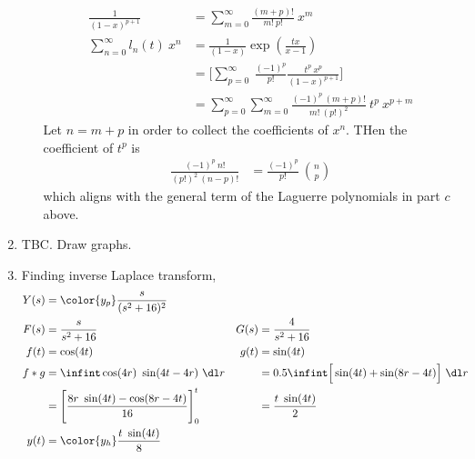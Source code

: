 \begin{enumerate}
\begin{enumerate}
\begin{align}
                        \frac{1}{(1 - x)^{p+1}}           & = \sum_{m=0}^{\infty}
                        \frac{(m+p)!}{m!\ p!}\ x^m                                \\
                        \sum_{n = 0}^{\infty} l_n(t)\ x^n & = \frac{1}{(1 - x)}
                        \exp\left( \frac{tx}{x-1} \right)                         \\
                                                          & = \Bigg[
                            \sum_{p=0}^{\infty}\  \frac{(-1)^p}{p!}
                        \frac{t^p\ x^p}{(1 - x)^{p+1}} \Bigg]                     \\
                                                          & = \sum_{p=0}^{\infty}
                        \sum_{m = 0}^{\infty} \frac{(-1)^p\ (m+p)!}{m!\ (p!)^2}
                        \ t^p\ x^{p+m}
                    \end{align}
                    Let $ n = m+p $ in order to collect the coefficients of $ x^n $.
                    THen the coefficient of $ t^p $ is
                    \begin{align}
                        \frac{(-1)^p\ n!}{(p!)^2\ (n-p)!} & = \frac{(-1)^p}{p!}
                        \ \binom{n}{p}
                    \end{align}
                    which aligns with the general term of the Laguerre polynomials in
                    part $ c $ above.
          \end{enumerate}

    \item TBC. Draw graphs.

    \item Finding inverse Laplace transform,
          \begin{align}
              Y(s) & = \color{y_p} \frac{s}{(s^2 + 16)^2}                          \\
              F(s) & = \frac{s}{s^2 + 16}                                        &
              G(s) & = \frac{4}{s^2 + 16}                                          \\
              f(t) & = \cos(4t)                                                  &
              g(t) & = \sin(4t)                                                    \\
              f*g  & = \infint \cos(4r)\ \sin(4t - 4r)\ \dl r                    &
                   & = 0.5 \infint \Big[\sin(4t) + \sin(8r - 4t)\Big]\ \dl r       \\
                   & = \Bigg[ \frac{8r\ \sin(4t) - \cos(8r - 4t)}{16} \Bigg]_0^t &
                   & = \frac{t\ \sin(4t)}{2}                                       \\
              y(t) & = \color{y_h} \frac{t\ \sin(4t)}{8}
          \end{align}


\end{enumerate}
